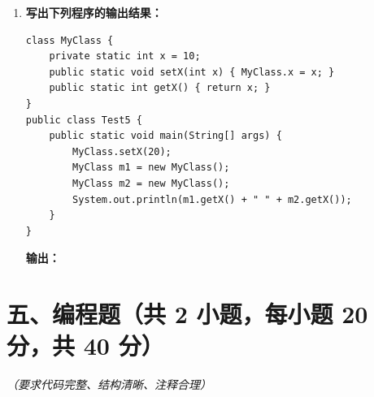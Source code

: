 \documentclass[a3paper, landscape, 11pt, twocolumn]{article}
\begin{document}
\begin{enumerate}[leftmargin=*, label=\arabic*., itemsep=1em]
	\item \textbf{写出下列程序的输出结果：}
	      \begin{lstlisting}[style=JavaExam]
class MyClass {
    private static int x = 10;
    public static void setX(int x) { MyClass.x = x; }
    public static int getX() { return x; }
}
public class Test5 {
    public static void main(String[] args) {
        MyClass.setX(20);
        MyClass m1 = new MyClass();
        MyClass m2 = new MyClass();
        System.out.println(m1.getX() + " " + m2.getX());
    }
}
\end{lstlisting}
	      \textbf{输出：}\underline{\hspace{6cm}}
\end{enumerate}

\newpage
\vspace{0.5cm}

\section*{五、编程题（共 2 小题，每小题 20 分，共 40 分）}
\textit{（要求代码完整、结构清晰、注释合理）}
\end{document}
